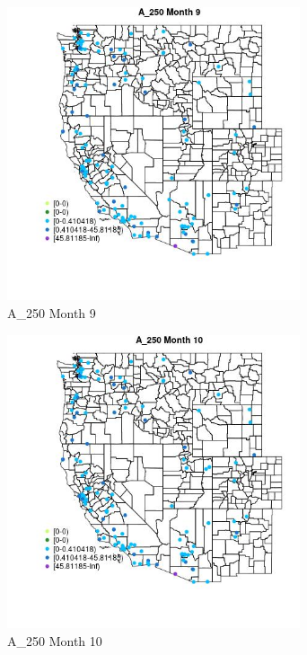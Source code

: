 \begin{figure} 
\centering  
\includegraphics[width=0.77\textwidth]{Code_Outputs/Report_ML_input_PM25_Step4_part_e_de_duplicated_aves_MapObsMo9A_250.jpg} 
\caption{\label{fig:Report_ML_input_PM25_Step4_part_e_de_duplicated_avesMapObsMo9A_250}A_250 Month 9} 
\end{figure} 
 

\begin{figure} 
\centering  
\includegraphics[width=0.77\textwidth]{Code_Outputs/Report_ML_input_PM25_Step4_part_e_de_duplicated_aves_MapObsMo10A_250.jpg} 
\caption{\label{fig:Report_ML_input_PM25_Step4_part_e_de_duplicated_avesMapObsMo10A_250}A_250 Month 10} 
\end{figure} 
 

